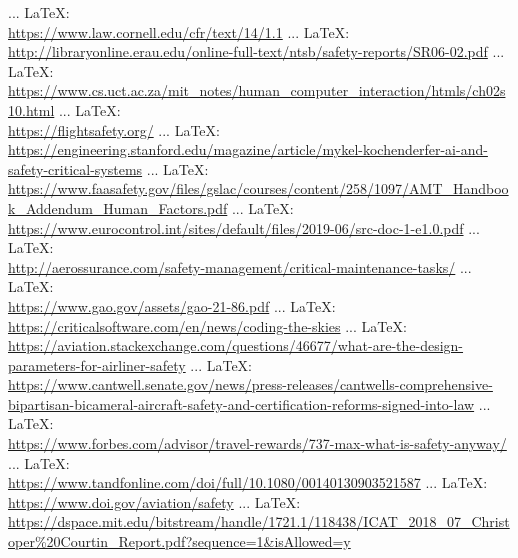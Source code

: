 \begin{thebibliography}{99}
{{{{{{ ... \LaTeX:\\ \url{https://www.law.cornell.edu/cfr/text/14/1.1}
 ... \LaTeX:\\ \url{http://libraryonline.erau.edu/online-full-text/ntsb/safety-reports/SR06-02.pdf}
 ... \LaTeX:\\ \url{https://www.cs.uct.ac.za/mit_notes/human_computer_interaction/htmls/ch02s10.html}
 ... \LaTeX:\\ \url{https://flightsafety.org/}
 ... \LaTeX:\\ \url{https://engineering.stanford.edu/magazine/article/mykel-kochenderfer-ai-and-safety-critical-systems}
 ... \LaTeX:\\ \url{https://www.faasafety.gov/files/gslac/courses/content/258/1097/AMT_Handbook_Addendum_Human_Factors.pdf}
 ... \LaTeX:\\ \url{https://www.eurocontrol.int/sites/default/files/2019-06/src-doc-1-e1.0.pdf}
 ... \LaTeX:\\ \url{http://aerossurance.com/safety-management/critical-maintenance-tasks/}
 ... \LaTeX:\\ \url{https://www.gao.gov/assets/gao-21-86.pdf}
 ... \LaTeX:\\ \url{https://criticalsoftware.com/en/news/coding-the-skies}
 ... \LaTeX:\\ \url{https://aviation.stackexchange.com/questions/46677/what-are-the-design-parameters-for-airliner-safety}
 ... \LaTeX:\\ \url{https://www.cantwell.senate.gov/news/press-releases/cantwells-comprehensive-bipartisan-bicameral-aircraft-safety-and-certification-reforms-signed-into-law}
 ... \LaTeX:\\ \url{https://www.forbes.com/advisor/travel-rewards/737-max-what-is-safety-anyway/}
 ... \LaTeX:\\ \url{https://www.tandfonline.com/doi/full/10.1080/00140130903521587}
 ... \LaTeX:\\ \url{https://www.doi.gov/aviation/safety}
 ... \LaTeX:\\ \url{https://dspace.mit.edu/bitstream/handle/1721.1/118438/ICAT_2018_07_Christoper%20Courtin_Report.pdf?sequence=1&isAllowed=y}
}}}}}}
\end{thebibliography}
